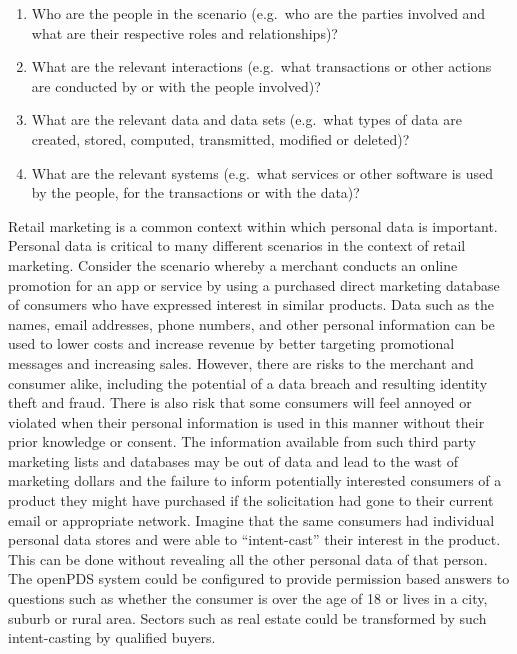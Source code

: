 \begin{enumerate}
\item Who are the people in the scenario (e.g.~who are the parties involved and what are their respective roles and relationships)? 
\item What are the relevant interactions (e.g.~what transactions or other actions are conducted by or with the people involved)?
\item What are the relevant data and data sets (e.g.~what types of data are created, stored, computed, transmitted, modified or deleted)?
\item What are the relevant systems (e.g.~what services or other software is used by the people, for the transactions or with the data)? 
\end{enumerate}

Retail marketing is a common context within which personal data is important.
Personal data is critical to many different scenarios in the context of retail marketing. 
Consider the scenario whereby a merchant conducts an online promotion for an app or service by using a purchased direct marketing database of consumers who have expressed interest in similar products.
Data such as the names, email addresses, phone numbers, and other personal information can be used to lower costs and increase revenue by better targeting promotional messages and increasing sales.
However, there are risks to the merchant and consumer alike, including the potential of a data breach and resulting identity theft and fraud.
There is also risk that some consumers will feel annoyed or violated when their personal information is used in this manner without their prior knowledge or consent.
The information available from such third party marketing lists and databases may be out of data and lead to the wast of marketing dollars and the failure to inform potentially interested consumers of a product they might have purchased if the solicitation had gone to their current email or appropriate network.
Imagine that the same consumers had individual personal data stores and were able to ``intent-cast'' their interest in the product.
This can be done without revealing all the other personal data of that person.
The openPDS system could be configured to provide permission based answers to questions such as whether the consumer is over the age of 18 or lives in a city, suburb or rural area.
Sectors such as real estate could be transformed by such intent-casting by qualified buyers.   

